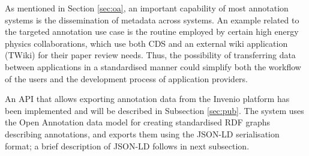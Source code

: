 
As mentioned in Section \ref{sec:oa}, an important capability of most
annotation systems is the dissemination of metadata across systems. An example
related to the targeted annotation use case is the routine employed by certain
high energy physics collaborations, which use both CDS and an external wiki
application (TWiki) for their paper review needs. Thus, the possibility of
transferring data between applications in a standardised manner could simplify
both the workflow of the users and the development process of application
providers.

An API that allows exporting annotation data from the Invenio platform has been
implemented and will be described in Subsection \ref{sec:pub}. The system uses
the Open Annotation data model for creating standardised RDF graphs describing
annotations, and exports them using the JSON-LD serialisation format; a brief
description of JSON-LD follows in next subsection.
